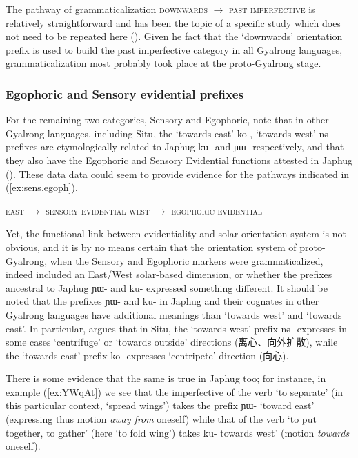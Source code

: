 \documentclass[oldfontcommands,oneside,a4paper,11pt]{article}
\newcommand{\ipa}[1]{\mbox{\phon #1}} %
\newcommand{\zh}[1]{{\cn #1}}
\begin{document}
The pathway of grammaticalization \textsc{downwards} $\rightarrow $ \textsc{past imperfective} is relatively straightforward and has been the topic of a specific study which does not need to be repeated here (\citealt{lin11direction}). Given he fact that the `downwards' orientation prefix is used to build the past imperfective category in all Gyalrong languages, grammaticalization most probably took place at the proto-Gyalrong stage.

\subsubsection{Egophoric and Sensory evidential prefixes}

For the remaining two categories, Sensory and Egophoric, note that in other Gyalrong languages, including Situ, the `towards east' \ipa{ko-}, `towards west' \ipa{nə-} prefixes are etymologically related to Japhug \ipa{ku-} and \ipa{ɲɯ-} respectively, and that they also have the Egophoric and Sensory Evidential functions attested in Japhug (\citealt{lin02dimension}). These data data could seem to provide evidence for the pathways indicated in (\ref{ex:sens.egoph}).


\begin{exe}
\ex \label{ex:sens.egoph}
\glt \textsc{east} $\rightarrow $ \textsc{sensory evidential} 
\glt \textsc{west} $\rightarrow $ \textsc{egophoric evidential}
\end{exe}

Yet, the functional link between evidentiality and solar orientation system is not obvious, and it is by no means certain that the orientation system of proto-Gyalrong, when the Sensory and Egophoric markers were grammaticalized, indeed included an East/West solar-based dimension, or whether the prefixes ancestral to Japhug \ipa{ɲɯ-} and \ipa{ku-} expressed something different.  It should be noted that the prefixes  \ipa{ɲɯ-} and \ipa{ku-} in Japhug and their cognates in other Gyalrong languages have additional meanings than `towards west' and `towards east'. In particular, \citet[228-9]{linxr93jiarong} argues that in Situ, the `towards west' prefix \ipa{nə-} expresses in some cases `centrifuge' or `towards outside' directions (\zh{离心、向外扩散}), while the `towards east' prefix \ipa{ko-} expresses `centripete' direction (\zh{向心}). 

There is some evidence that the same is true in Japhug too; for instance, in example (\ref{ex:YWqAt}) we see that the imperfective of the verb `to separate' (in this particular context, `spread wings') takes the prefix \ipa{ɲɯ-} `toward east' (expressing thus motion \textit{away from} oneself) while that of the verb `to put together, to gather' (here `to fold wing') takes \ipa{ku-}  towards west' (motion \textit{towards} oneself).
\end{document}
